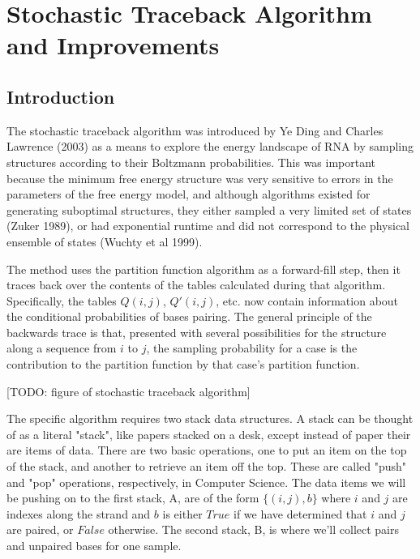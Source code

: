 \chapter{Stochastic Traceback Algorithm and Improvements}
\section{Introduction}

The stochastic traceback algorithm was introduced by Ye Ding and
Charles Lawrence (2003) as a means to explore the energy landscape of
RNA by sampling structures according to their Boltzmann
probabilities. This was important because the minimum free energy
structure was very sensitive to errors in the parameters of the free
energy model, and although algorithms existed for generating
suboptimal structures, they either sampled a very limited set of
states (Zuker 1989), or had exponential runtime and did not correspond
to the physical ensemble of states (Wuchty et al 1999).

The method uses the partition function algorithm as a forward-fill
step, then it traces back over the contents of the tables calculated
during that algorithm. Specifically, the tables $Q(i,j)$, $Q'(i,j)$,
etc. now contain information about the conditional probabilities of
bases pairing. The general principle of the backwards trace is that,
presented with several possibilities for the structure along a
sequence from $i$ to $j$, the sampling probability for a case is the
contribution to the partition function by that case's partition
function. 

[TODO: figure of stochastic traceback algorithm]

The specific algorithm requires two stack data structures. A stack can
be thought of as a literal "stack", like papers stacked on a desk,
except instead of paper their are items of data. There are two basic
operations, one to put an item on the top of the stack, and another to
retrieve an item off the top. These are called "push" and "pop"
operations, respectively, in Computer Science. The data items we will
be pushing on to the first stack, A, are of the form $\{(i,j), b\}$
where $i$ and $j$ are indexes along the strand and $b$ is either
$True$ if we have determined that $i$ and $j$ are paired, or $False$
otherwise. The second stack, B, is where we'll collect pairs and
unpaired bases for one sample.

